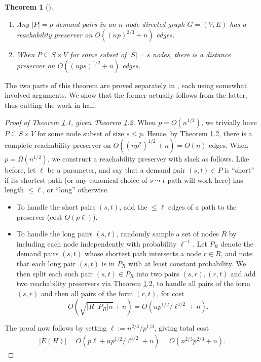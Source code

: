 \documentclass{article}
\newtheorem{theorem}{Theorem}
\begin{document}
\begin{theorem} [\cite{AB18}] \label{thm:reachubs} ~
\begin{enumerate}
\item Any $|P|=p$ demand pairs in an $n$-node directed graph $G = (V, E)$ has a reachability preserver on $O((np)^{2/3} + n)$ edges.

\item When $P \subseteq S \times V$ for some subset of $|S|=s$ nodes, there is a distance preserver on $O((nps)^{1/2} + n)$ edges.
\end{enumerate}
\end{theorem}

The two parts of this theorem are proved separately in \cite{AB18}, each using somewhat involved arguments.
We show that the former actually follows from the latter, thus cutting the work in half.
\begin{proof} [Proof of Theorem \ref{thm:reachubs}.1, given Theorem \ref{thm:reachubs}.2]

When $p = O(n^{1/2})$, we trivially have $P \subseteq S \times V$ for some node subset of size $s \le p$.
Hence, by Theorem \ref{thm:reachubs}.2, there is a complete reachability preserver on $O((np^2)^{1/2} + n) = O(n)$ edges.
When $p = \Omega(n^{1/2})$, we construct a reachability preserver with slack as follows.
Like before, let $\ell$ be a parameter, and say that a demand pair $(s, t) \in P$ is ``short'' if its shortest path (or any canonical choice of $s \leadsto t$ path will work here) has length $\le \ell$, or ``long'' otherwise.
\begin{itemize}
\item To handle the short pairs $(s, t)$, add the $\le \ell$ edges of a path to the preserver (cost $O(p \ell)$).

\item To handle the long pairs $(s, t)$, randomly sample a set of nodes $R$ by including each node independently with probability $\ell^{-1}$.
Let $P_R$ denote the demand pairs $(s, t)$ whose shortest path intersects a node $r \in R$, and note that each long pair $(s, t)$ is in $P_R$ with at least constant probability.
We then split each such pair $(s, t) \in P_R$ into two pairs $(s, r), (r, t)$ and add two reachability preservers via Theorem \ref{thm:reachubs}.2, to handle all pairs of the form $(s, r)$ and then all pairs of the form $(r, t)$, for cost
$$O\left(\sqrt{|R||P_R|n} + n\right) = O\left(np^{1/2} / \ell^{1/2} + n\right).$$
\end{itemize}
The proof now follows by setting $\ell := n^{2/3} / p^{1/3}$, giving total cost
\begin{align*}
|E(H)| = O\left(p\ell + np^{1/2}/\ell^{1/2} + n\right) = O\left(n^{2/3} p^{2/3} + n\right). \tag*{\qedhere}
\end{align*}
\end{proof}
\end{document}
